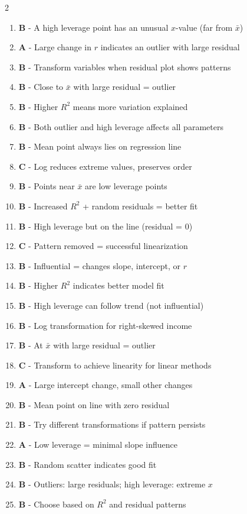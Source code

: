 \documentclass[11pt]{article}
\begin{document}
\begin{multicols}{2}
\begin{enumerate}
\item \textbf{B} - A high leverage point has an unusual $x$-value (far from $\bar{x}$)
\item \textbf{A} - Large change in $r$ indicates an outlier with large residual
\item \textbf{B} - Transform variables when residual plot shows patterns
\item \textbf{B} - Close to $\bar{x}$ with large residual = outlier
\item \textbf{B} - Higher $R^2$ means more variation explained
\item \textbf{B} - Both outlier and high leverage affects all parameters
\item \textbf{B} - Mean point always lies on regression line
\item \textbf{C} - Log reduces extreme values, preserves order
\item \textbf{B} - Points near $\bar{x}$ are low leverage points
\item \textbf{B} - Increased $R^2$ + random residuals = better fit
\item \textbf{B} - High leverage but on the line (residual = 0)
\item \textbf{C} - Pattern removed = successful linearization
\item \textbf{B} - Influential = changes slope, intercept, or $r$
\item \textbf{B} - Higher $R^2$ indicates better model fit
\item \textbf{B} - High leverage can follow trend (not influential)
\item \textbf{B} - Log transformation for right-skewed income
\item \textbf{B} - At $\bar{x}$ with large residual = outlier
\item \textbf{C} - Transform to achieve linearity for linear methods
\item \textbf{A} - Large intercept change, small other changes
\item \textbf{B} - Mean point on line with zero residual
\item \textbf{B} - Try different transformations if pattern persists
\item \textbf{A} - Low leverage = minimal slope influence
\item \textbf{B} - Random scatter indicates good fit
\item \textbf{B} - Outliers: large residuals; high leverage: extreme $x$
\item \textbf{B} - Choose based on $R^2$ and residual patterns
\end{enumerate}
\end{multicols}
\end{document}
